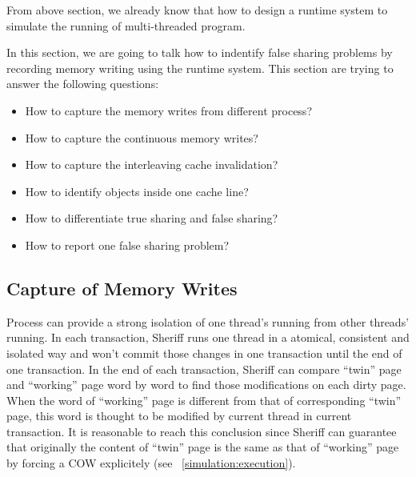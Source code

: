 \label{sec:falseshare}
From above section, we already know that how to design a runtime system to simulate the running 
of multi-threaded program. 

In this section, we are going to talk how to indentify false sharing problems by recording memory writing using
the runtime system.
This section are trying to answer the following questions:

\begin{itemize}
\item How to capture the memory writes from different process?
\item How to capture the continuous memory writes?
\item How to capture the interleaving cache invalidation? 
\item How to identify objects inside one cache line? 
\item How to differentiate true sharing and false sharing?
\item How to report one false sharing problem?
\end{itemize}

\subsection{Capture of Memory Writes}
\label{falseshare:memorywrites}
Process can provide a strong isolation of one thread's running from other threads' running. 
In each transaction, Sheriff runs one thread in a atomical, consistent and isolated way and
won't commit those changes in one transaction until the end of one transaction.
In the end of each transaction, Sheriff can compare ``twin'' page and ``working'' page word by word to find 
those modifications on each dirty page. When the word of ``working'' page is different from that of 
corresponding ``twin'' page, this word is thought to be modified by current thread in current transaction. 
It is reasonable to reach this conclusion since Sheriff can guarantee that originally the content of ``twin'' page 
is the same as that of ``working'' page by forcing a COW explicitely (see ~\ref{simulation:execution}).
\begin{comment}
It is true that the writing of ``A-B-A''  can be missed by simply comparison,
but we believe that ``A-B-A'' writing in one transaction
is not frequent and won't bring any correctness problem.
We don't want to put too much focus on this point.
\end{comment}

